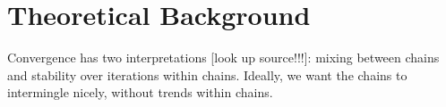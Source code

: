\documentclass[article]{jss}
\begin{document}
% 
% 

\section{Theoretical Background} \label{sec:background}

Convergence has two interpretations [look up source!!!]: mixing between chains and stability over iterations within chains. Ideally, we want the chains to intermingle nicely, without trends within chains. 
\end{document}
